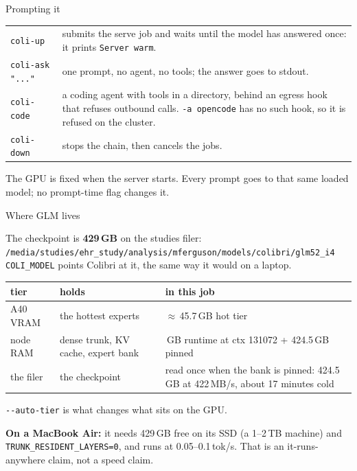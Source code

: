 \documentclass[aspectratio=169]{beamer}
\newcommand{\keybox}[1]{%
  \begin{center}
  \colorbox{black!8}{\parbox{0.92\textwidth}{\centering #1}}
  \end{center}}
\begin{document}
\begin{frame}{Prompting it}

\small
\begin{tabular}{@{}lp{}@{}}
\toprule
\texttt{coli-up} & submits the serve job and waits until the model has answered once: it prints \texttt{Server warm}. \\
\texttt{coli-ask "..."} & one prompt, no agent, no tools; the answer goes to stdout. \\
\texttt{coli-code} & a coding agent with tools in a directory, behind an egress hook that refuses outbound calls. \texttt{-a opencode} has no such hook, so it is refused on the cluster. \\
\texttt{coli-down} & stops the chain, then cancels the jobs. \\
\bottomrule
\end{tabular}

\vspace{1em}
\keybox{The GPU is fixed when the server starts. Every prompt goes to that same loaded model; no prompt-time flag changes it.}

\end{frame}

\begin{frame}{Where GLM lives}

\small
The checkpoint is \textbf{429\,GB} on the studies filer:\\
{\footnotesize\texttt{/media/studies/ehr\_study/analysis/mferguson/models/colibri/glm52\_i4}}\\
\texttt{COLI\_MODEL} points Colibri at it, the same way it would on a laptop.

\vspace{0.6em}
\begin{center}
\begin{tabular}{@{}ll>{\raggedright\arraybackslash}p{}@{}}
\toprule
tier & holds & in this job \\
\midrule
A40 VRAM & the hottest experts & $\approx$\,45.7\,GB hot tier \\
node RAM & dense trunk, KV cache, expert bank & 45.0\,GB runtime at ctx 131072 + 424.5\,GB pinned \\
the filer & the checkpoint & read once when the bank is pinned: 424.5\,GB at 422\,MB/s, about 17 minutes cold \\
\bottomrule
\end{tabular}
\end{center}

\vspace{0.4em}
\texttt{-{}-auto-tier} is what changes what sits on the GPU.

\vspace{0.4em}
\textbf{On a MacBook Air:} it needs 429\,GB free on its SSD (a 1--2\,TB machine) and \texttt{TRUNK\_RESIDENT\_LAYERS=0}, and runs at 0.05--0.1\,tok/s. That is an it-runs-anywhere claim, not a speed claim.

\end{frame}
\end{document}
